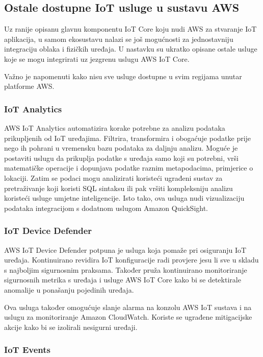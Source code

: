 \subsection{Ostale dostupne IoT usluge u sustavu AWS}

Uz ranije opisanu glavnu komponentu IoT Core koju nudi AWS za stvaranje IoT aplikacija, u samom ekosustavu nalazi se još mogućnosti za jednostavniju integraciju oblaka i fizičkih uređaja. U nastavku su ukratko opisane ostale usluge koje se mogu integrirati uz jezgrenu uslugu AWS IoT Core.

Važno je napomenuti kako nisu sve usluge dostupne u svim regijama unutar platforme AWS.

\subsubsection{IoT Analytics}

AWS IoT Analytics automatizira korake potrebne za analizu podataka prikupljenih od IoT uređajima. Filtrira, transformira i obogaćuje podatke prije nego ih pohrani u vremensku bazu podataka za daljnju analizu. Moguće je postaviti uslugu da prikuplja podatke s uređaja samo koji su potrebni, vrši matematičke operacije i dopunjava podatke raznim metapodacima, primjerice o lokaciji. Zatim se podaci mogu analizirati koristeći ugrađeni sustav za pretraživanje koji koristi SQL sintaksu ili pak vršiti kompleksniju analizu koristeći usluge umjetne inteligencije. Isto tako, ova usluga nudi vizualizaciju podataka integracijom s dodatnom uslugom Amazon QuickSight. 

\subsubsection{IoT Device Defender}

AWS IoT Device Defender potpuna je usluga koja pomaže pri osiguranju IoT uređaja. Kontinuirano revidira IoT konfiguracije radi provjere jesu li sve u skladu s najboljim sigurnosnim praksama. Također pruža kontinuirano monitoriranje sigurnosnih metrika s uređaja i usluge AWS IoT Core kako bi se detektirale anomalije u ponašanju pojedinih uređaja. 

Ova usluga također omogućuje slanje alarma na konzolu AWS IoT sustava i na uslugu za monitoriranje Amazon CloudWatch. Koriste se ugrađene mitigacijske akcije kako bi se izolirali nesigurni uređaji.

\subsubsection{IoT Events}

